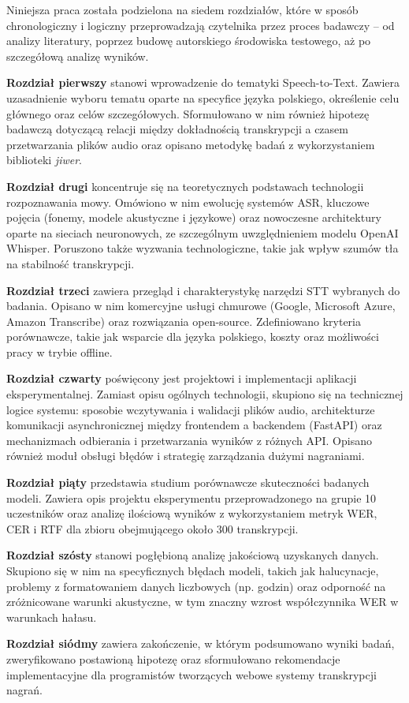 Niniejsza praca została podzielona na siedem rozdziałów, które w sposób chronologiczny i logiczny przeprowadzają czytelnika przez proces badawczy – od analizy literatury, poprzez budowę autorskiego środowiska testowego, aż po szczegółową analizę wyników.

\textbf{Rozdział pierwszy} stanowi wprowadzenie do tematyki Speech-to-Text. Zawiera uzasadnienie wyboru tematu oparte na specyfice języka polskiego, określenie celu głównego oraz celów szczegółowych. Sformułowano w nim również hipotezę badawczą dotyczącą relacji między dokładnością transkrypcji a czasem przetwarzania plików audio oraz opisano metodykę badań z wykorzystaniem biblioteki \textit{jiwer}.

\textbf{Rozdział drugi} koncentruje się na teoretycznych podstawach technologii rozpoznawania mowy. Omówiono w nim ewolucję systemów ASR, kluczowe pojęcia (fonemy, modele akustyczne i językowe) oraz nowoczesne architektury oparte na sieciach neuronowych, ze szczególnym uwzględnieniem modelu OpenAI Whisper. Poruszono także wyzwania technologiczne, takie jak wpływ szumów tła na stabilność transkrypcji.

\textbf{Rozdział trzeci} zawiera przegląd i charakterystykę narzędzi STT wybranych do badania. Opisano w nim komercyjne usługi chmurowe (Google, Microsoft Azure, Amazon Transcribe) oraz rozwiązania open-source. Zdefiniowano kryteria porównawcze, takie jak wsparcie dla języka polskiego, koszty oraz możliwości pracy w trybie offline.

\textbf{Rozdział czwarty} poświęcony jest projektowi i implementacji aplikacji eksperymentalnej. Zamiast opisu ogólnych technologii, skupiono się na technicznej logice systemu: sposobie wczytywania i walidacji plików audio, architekturze komunikacji asynchronicznej między frontendem a backendem (FastAPI) oraz mechanizmach odbierania i przetwarzania wyników z różnych API. Opisano również moduł obsługi błędów i strategię zarządzania dużymi nagraniami.

\textbf{Rozdział piąty} przedstawia studium porównawcze skuteczności badanych modeli. Zawiera opis projektu eksperymentu przeprowadzonego na grupie 10 uczestników oraz analizę ilościową wyników z wykorzystaniem metryk WER, CER i RTF dla zbioru obejmującego około 300 transkrypcji.

\textbf{Rozdział szósty} stanowi pogłębioną analizę jakościową uzyskanych danych. Skupiono się w nim na specyficznych błędach modeli, takich jak halucynacje, problemy z formatowaniem danych liczbowych (np. godzin) oraz odporność na zróżnicowane warunki akustyczne, w tym znaczny wzrost współczynnika WER w warunkach hałasu.

\textbf{Rozdział siódmy} zawiera zakończenie, w którym podsumowano wyniki badań, zweryfikowano postawioną hipotezę oraz sformułowano rekomendacje implementacyjne dla programistów tworzących webowe systemy transkrypcji nagrań.

